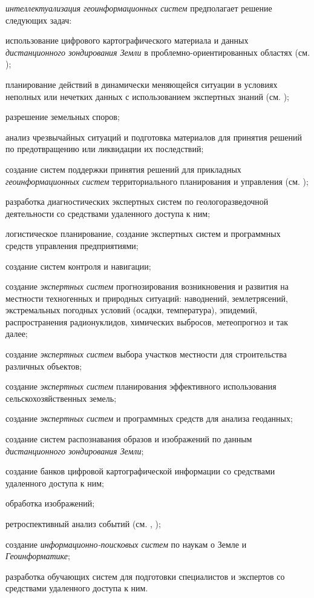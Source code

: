 \textit{интеллектуализация геоинформационных систем} предполагает решение следующих задач:
\begin{textitemize}
	\item использование цифрового картографического материала и данных \textit{дистанционного зондирования Земли} в проблемно-ориентированных областях (см. );
	\item планирование действий в динамически меняющейся ситуации в условиях неполных или нечетких данных с использованием экспертных знаний (см. ); 
	\item разрешение земельных споров;
	\item анализ чрезвычайных ситуаций и подготовка материалов для принятия решений по предотвращению или ликвидации их последствий; 
	\item создание систем поддержки принятия решений для прикладных \textit{геоинформационных систем} территориального планирования и управления (см. ); 
	\item разработка диагностических экспертных систем по геологоразведочной деятельности со средствами удаленного доступа к ним;
	\item логистическое планирование, создание экспертных систем и программных средств управления предприятиями;
	\item создание систем контроля и навигации;
	\item создание \textit{экспертных систем} прогнозирования возникновения и развития на местности техногенных и природных ситуаций: наводнений, землетрясений, экстремальных погодных условий (осадки, температура), эпидемий, распространения радионуклидов, химических выбросов, метеопрогноз и так далее;
	\item создание \textit{экспертных систем} выбора участков местности для строительства различных объектов;
	\item создание \textit{экспертных систем} планирования эффективного использования сельскохозяйственных земель;
	\item создание \textit{экспертных систем} и программных средств для анализа геоданных;
	\item создание систем распознавания образов и изображений по данным \textit{дистанционного зондирования Земли};
	\item создание банков цифровой картографической информации со средствами удаленного доступа к ним;
	\item обработка изображений;
	\item ретроспективный анализ событий (см. , );
	\item создание \textit{информационно-поисковых систем} по наукам о Земле и \textit{Геоинформатике};
	\item разработка обучающих систем для подготовки специалистов и экспертов со средствами удаленного доступа к ним.
\end{textitemize}

